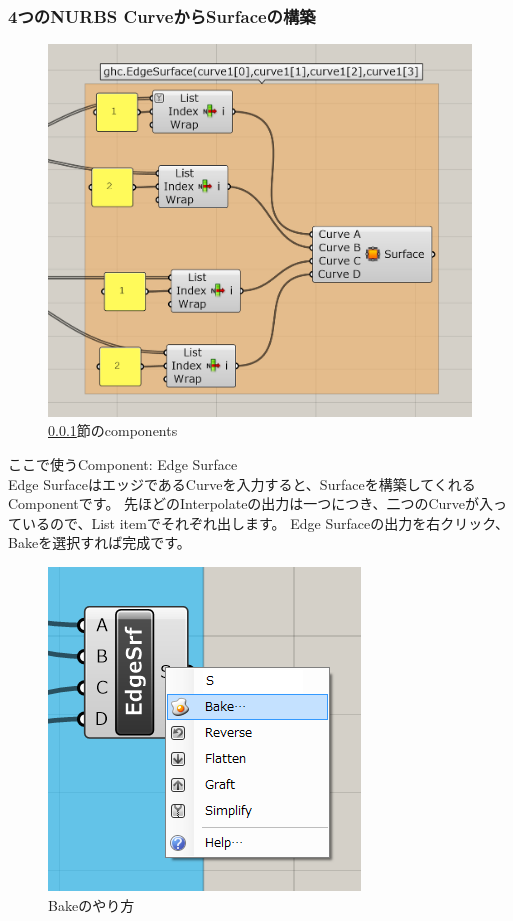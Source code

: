 \documentclass[11pt]{jarticle}
\begin{document}
\subsubsection{4つのNURBS CurveからSurfaceの構築}
\label{sec:s4}
\begin{figure}[H]
  \centering
    \includegraphics[width=0.7\linewidth]{fig/p3.png}
    \caption{\ref{sec:s4}節のcomponents}
    \label{fig:components4}
\end{figure}

ここで使うComponent: Edge Surface\\
Edge SurfaceはエッジであるCurveを入力すると、Surfaceを構築してくれるComponentです。
先ほどのInterpolateの出力は一つにつき、二つのCurveが入っているので、List itemでそれぞれ出します。
Edge Surfaceの出力を右クリック、Bakeを選択すれば完成です。

\begin{figure}[H]
  \centering
    \includegraphics[width=0.6\linewidth]{fig/bake.png}
    \caption{Bakeのやり方}
  \label{fig:scanipflow}
\end{figure}
%
\end{document}
